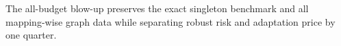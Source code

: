 The all-budget blow-up preserves the exact singleton benchmark and all mapping-wise graph data while separating robust risk and adaptation price by one quarter.